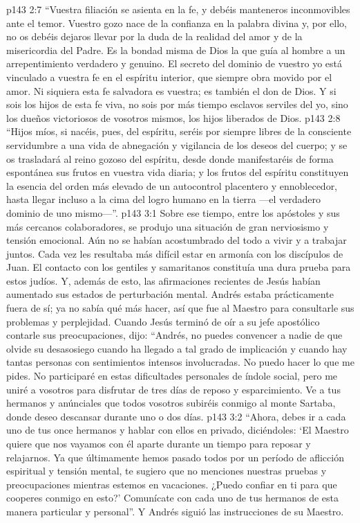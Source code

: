 \vs p143 2:7 “Vuestra filiación se asienta en la fe, y debéis manteneros inconmovibles ante el temor. Vuestro gozo nace de la confianza en la palabra divina y, por ello, no os debéis dejaros llevar por la duda de la realidad del amor y de la misericordia del Padre. Es la bondad misma de Dios la que guía al hombre a un arrepentimiento verdadero y genuino. El secreto del dominio de vuestro yo está vinculado a vuestra fe en el espíritu interior, que siempre obra movido por el amor. Ni siquiera esta fe salvadora es vuestra; es también el don de Dios. Y si sois los hijos de esta fe viva, no sois por más tiempo esclavos serviles del yo, sino los dueños victoriosos de vosotros mismos, los hijos liberados de Dios.
\vs p143 2:8 “Hijos míos, si nacéis, pues, del espíritu, seréis por siempre libres de la consciente servidumbre a una vida de abnegación y vigilancia de los deseos del cuerpo; y se os trasladará al reino gozoso del espíritu, desde donde manifestaréis de forma espontánea sus frutos en vuestra vida diaria; y los frutos del espíritu constituyen la esencia del orden más elevado de un autocontrol placentero y ennoblecedor, hasta llegar incluso a la cima del logro humano en la tierra ---el verdadero dominio de uno mismo---”.
\vs p143 3:1 Sobre ese tiempo, entre los apóstoles y sus más cercanos colaboradores, se produjo una situación de gran nerviosismo y tensión emocional. Aún no se habían acostumbrado del todo a vivir y a trabajar juntos. Cada vez les resultaba más difícil estar en armonía con los discípulos de Juan. El contacto con los gentiles y samaritanos constituía una dura prueba para estos judíos. Y, además de esto, las afirmaciones recientes de Jesús habían aumentado sus estados de perturbación mental. Andrés estaba prácticamente fuera de sí; ya no sabía qué más hacer, así que fue al Maestro para consultarle sus problemas y perplejidad. Cuando Jesús terminó de oír a su jefe apostólico contarle sus preocupaciones, dijo: “Andrés, no puedes convencer a nadie de que olvide su desasosiego cuando ha llegado a tal grado de implicación y cuando hay tantas personas con sentimientos intensos involucradas. No puedo hacer lo que me pides. No participaré en estas dificultades personales de índole social, pero me uniré a vosotros para disfrutar de tres días de reposo y esparcimiento. Ve a tus hermanos y anúnciales que todos vosotros subiréis conmigo al monte Sartaba, donde deseo descansar durante uno o dos días.
\vs p143 3:2 “Ahora, debes ir a cada uno de tus once hermanos y hablar con ellos en privado, diciéndoles: ‘El Maestro quiere que nos vayamos con él aparte durante un tiempo para reposar y relajarnos. Ya que últimamente hemos pasado todos por un período de aflicción espiritual y tensión mental, te sugiero que no menciones nuestras pruebas y preocupaciones mientras estemos en vacaciones. ¿Puedo confiar en ti para que cooperes conmigo en esto?’ Comunícate con cada uno de tus hermanos de esta manera particular y personal”. Y Andrés siguió las instrucciones de su Maestro.
